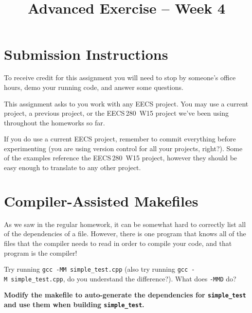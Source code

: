 \documentclass{article}
\begin{document}
\fancyfoot[C]{\color{gray} \thepage~/~\pageref*{LastPage}}
\pagestyle{fancyplain}


\title{\textbf{Advanced Exercise -- Week 4\\}}
\author{\textbf{\color{red}{Due: Before October 15, 10:00PM}}}
\date{}
\maketitle


\section*{Submission Instructions}
To receive credit for this assignment you will need to stop by someone's
office hours, demo your running code, and answer some questions.

\begin{mdframed}[innerleftmargin=38pt,innerrightmargin=38pt]\justify
  This assignment asks to you work with any EECS project. You may use a
  current project, a previous project, or the EECS\,280~W15 project we've been
  using throughout the homeworks so far.

  If you do use a current EECS project, remember to commit everything before
  experimenting (you are using version control for all your projects, right?).
  Some of the examples reference the EECS\,280~W15 project, however they should
  be easy enough to translate to any other project.
\end{mdframed}

\section{Compiler-Assisted Makefiles}

As we saw in the regular homework, it can be somewhat hard to correctly list
all of the dependencies of a file. However, there is one program that knows
all of the files that the compiler needs to read in order to compile your
code, and that program is the compiler!

Try running \texttt{gcc~-MM~simple\_test.cpp} (also try running
\texttt{gcc~-M~simple\_test.cpp}, do you understand the difference?).
What does \texttt{-MMD} do?

\textbf{Modify the makefile to auto-generate the dependencies for
  \texttt{simple\_test} and use them when building \texttt{simple\_test}.}
\end{document}
